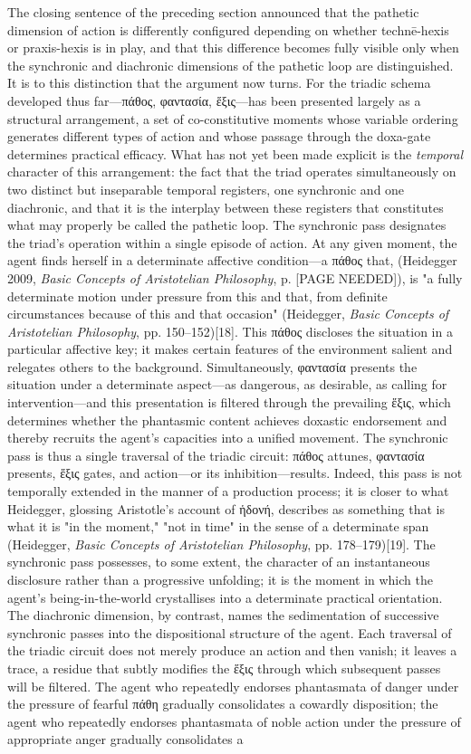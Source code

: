 \documentclass{article}
\begin{document}
The closing sentence of the preceding section announced that the pathetic dimension of action is differently configured depending on whether technē-hexis or praxis-hexis is in play, and that this difference becomes fully visible only when the synchronic and diachronic dimensions of the pathetic loop are distinguished. It is to this distinction that the argument now turns. For the triadic schema developed thus far—πάθος, φαντασία, ἕξις—has been presented largely as a structural arrangement, a set of co-constitutive moments whose variable ordering generates different types of action and whose passage through the doxa-gate determines practical efficacy. What has not yet been made explicit is the \textit{temporal} character of this arrangement: the fact that the triad operates simultaneously on two distinct but inseparable temporal registers, one synchronic and one diachronic, and that it is the interplay between these registers that constitutes what may properly be called the pathetic loop. The synchronic pass designates the triad's operation within a single episode of action. At any given moment, the agent finds herself in a determinate affective condition—a πάθος that, (Heidegger 2009, \textit{Basic Concepts of Aristotelian Philosophy}, p. [PAGE NEEDED]), is "a fully determinate motion under pressure from this and that, from definite circumstances because of this and that occasion" (Heidegger, \textit{Basic Concepts of Aristotelian Philosophy}, pp. 150–152)[18]. This πάθος discloses the situation in a particular affective key; it makes certain features of the environment salient and relegates others to the background. Simultaneously, φαντασία presents the situation under a determinate aspect—as dangerous, as desirable, as calling for intervention—and this presentation is filtered through the prevailing ἕξις, which determines whether the phantasmic content achieves doxastic endorsement and thereby recruits the agent's capacities into a unified movement. The synchronic pass is thus a single traversal of the triadic circuit: πάθος attunes, φαντασία presents, ἕξις gates, and action—or its inhibition—results. Indeed, this pass is not temporally extended in the manner of a production process; it is closer to what Heidegger, glossing Aristotle's account of ἡδονή, describes as something that is what it is "in the moment," "not in time" in the sense of a determinate span (Heidegger, \textit{Basic Concepts of Aristotelian Philosophy}, pp. 178–179)[19]. The synchronic pass possesses, to some extent, the character of an instantaneous disclosure rather than a progressive unfolding; it is the moment in which the agent's being-in-the-world crystallises into a determinate practical orientation. The diachronic dimension, by contrast, names the sedimentation of successive synchronic passes into the dispositional structure of the agent. Each traversal of the triadic circuit does not merely produce an action and then vanish; it leaves a trace, a residue that subtly modifies the ἕξις through which subsequent passes will be filtered. The agent who repeatedly endorses phantasmata of danger under the pressure of fearful πάθη gradually consolidates a cowardly disposition; the agent who repeatedly endorses phantasmata of noble action under the pressure of appropriate anger gradually consolidates a 
\end{document}
